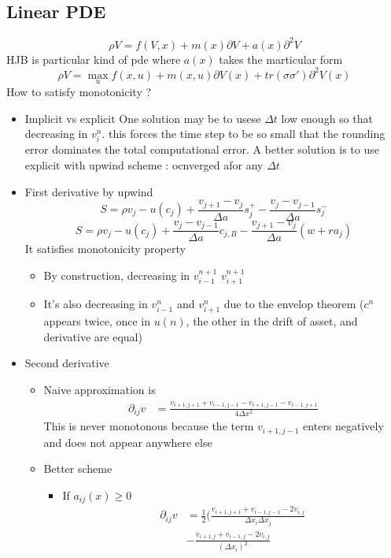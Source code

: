 \documentclass[english]{article}
\begin{document}
\subsection{Linear PDE}
$$\rho V = f(V, x) + m(x) \partial V + a(x) \partial^2V$$ 
HJB is particular kind of pde where $a(x)$ takes the marticular form
$$\rho V = \max_{u} f(x, u) + m(x, u) \partial V(x) + tr(\sigma \sigma') \partial^2 V(x)$$
How to satisfy monotonicity ?
\begin{itemize}
	\item Implicit vs explicit One solution may be to usese $\Delta t$ low enough so that decreasing in $v_{i}^{n}$. this forces the time step to be so small	that the rounding error dominates the total computational error.
	A better solution is to use explicit with upwind scheme : ocnverged afor any $\Delta t$
	\item First derivative by upwind
	$$S = \rho v_j - u(c_j) + \frac{v_{j+1}-v_{j}}{\Delta a} s_{j}^+ - \frac{v_j-v_{j-1}}{\Delta a} s_{j}^-$$
	$$S = \rho v_j - u(c_j) + \frac{v_j-v_{j-1}}{\Delta a} c_{j, B} - \frac{v_{j+1}-v_j}{\Delta a} (w + ra_j)$$
	It satisfies monotonicity property
	\begin{itemize}
		\item By construction, decreasing in $v_{i-1}^{n+1}$ $v_{i+1}^{n+1}$
		\item It's also decreasing in $v_{i-1}^{n}$ and $v_{i+1}^{n}$ due to the envelop theorem ($c^n$ appears twice, once in $u(n)$, the other in the drift of asset, and derivative are equal)
	\end{itemize}
	\item Second derivative
	\begin{itemize}
		\item Naive approximation is
		\begin{align*}
			\partial_{ij}v&=\frac{v_{i+1, j+1} + v_{i-1, j-1} - v_{i+1, j-1} - v_{i-1, j+1}}{4\Delta x^2}
		\end{align*}
		This is never monotonous because the term $v_{i+1, j-1}$ enters negatively and does not appear anywhere else
		\item Better scheme
		\begin{itemize}
			\item If $a_{ij}(x) \geq 0$
			\begin{align*}
				\partial_{ij}v&= \frac{1}{2}(\frac{v_{i+1, j+1} + v_{i-1, j-1}- 2v_{i,j}}{\Delta x_i \Delta x_j} \\
				&-  \frac{v_{i+1, j} + v_{i-1, j}- 2v_{i,j}}{(\Delta x_i)^2}\\

\end{align*}
\end{itemize}
\end{itemize}
\end{itemize}
\end{document}

